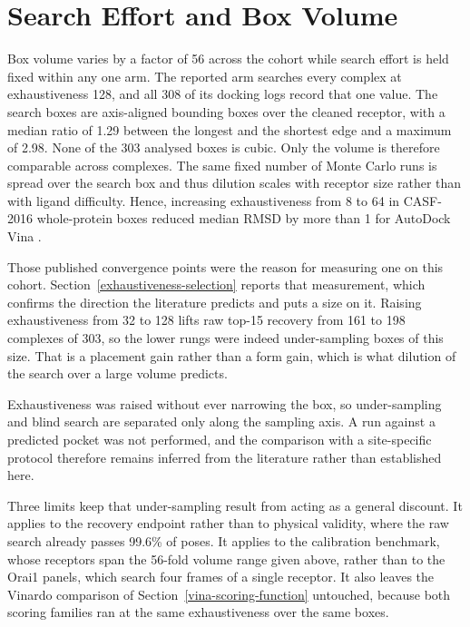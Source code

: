 \hypertarget{search-effort-and-box-volume}{%
\section{Search Effort and Box Volume}\label{search-effort-and-box-volume}}

Box volume varies by a factor of 56 across the cohort while search effort is held fixed within any one arm. The reported arm searches every complex at exhaustiveness 128, and all 308 of its docking logs record that one value. The search boxes are axis-aligned bounding boxes over the cleaned receptor, with a median ratio of 1.29 between the longest and the shortest edge and a maximum of 2.98. None of the 303 analysed boxes is cubic. Only the volume is therefore comparable across complexes. The same fixed number of Monte Carlo runs is spread over the search box and thus dilution scales with receptor size rather than with ligand difficulty. Hence, increasing exhaustiveness from 8 to 64 in CASF-2016 whole-protein boxes reduced median RMSD by more than 1\angstrom{} for AutoDock Vina \cite{ref082}.

Those published convergence points were the reason for measuring one on this cohort. Section~\ref{exhaustiveness-selection} reports that measurement, which confirms the direction the literature predicts and puts a size on it. Raising exhaustiveness from 32 to 128 lifts raw top-15 recovery from 161 to 198 complexes of 303, so the lower rungs were indeed under-sampling boxes of this size. That is a placement gain rather than a form gain, which is what dilution of the search over a large volume predicts.

Exhaustiveness was raised without ever narrowing the box, so under-sampling and blind search are separated only along the sampling axis. A run against a predicted pocket was not performed, and the comparison with a site-specific protocol therefore remains inferred from the literature rather than established here.

Three limits keep that under-sampling result from acting as a general discount. It applies to the recovery endpoint rather than to physical validity, where the raw search already passes 99.6\% of poses. It applies to the calibration benchmark, whose receptors span the 56-fold volume range given above, rather than to the Orai1 panels, which search four frames of a single receptor. It also leaves the Vinardo comparison of Section~\ref{vina-scoring-function} untouched, because both scoring families ran at the same exhaustiveness over the same boxes.

